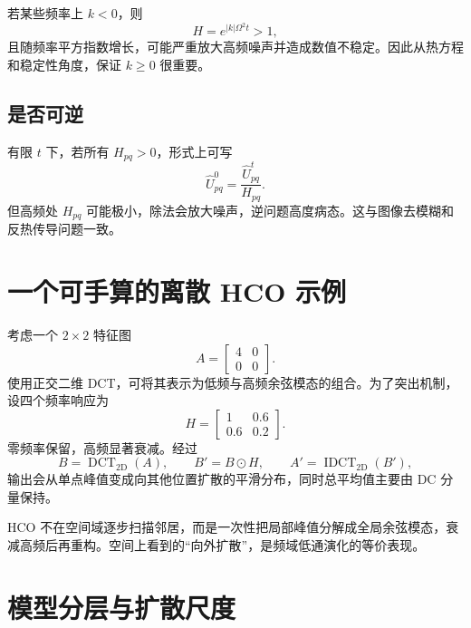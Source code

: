 \documentclass[UTF8,12pt,a4paper,fontset=none]{ctexart}
\numberwithin{equation}{section}
\newcommand{\DCT}{\operatorname{DCT}_{2\mathrm{D}}}
\newcommand{\IDCT}{\operatorname{IDCT}_{2\mathrm{D}}}
\begin{document}
若某些频率上 $k<0$，则
\begin{equation}
  H=e^{|k|\Omega^2t}>1,
\end{equation}
且随频率平方指数增长，可能严重放大高频噪声并造成数值不稳定。因此从热方程和稳定性角度，保证 $k\ge0$ 很重要。

\subsection{是否可逆}

有限 $t$ 下，若所有 $H_{pq}>0$，形式上可写
\begin{equation}
  \widehat U^0_{pq}
  =\frac{\widehat U^t_{pq}}{H_{pq}}.
\end{equation}
但高频处 $H_{pq}$ 可能极小，除法会放大噪声，逆问题高度病态。这与图像去模糊和反热传导问题一致。

\section{一个可手算的离散 HCO 示例}

考虑一个 $2\times2$ 特征图
\begin{equation}
  A=
  \begin{bmatrix}
    4&0\\
    0&0
  \end{bmatrix}.
\end{equation}
使用正交二维 DCT，可将其表示为低频与高频余弦模态的组合。为了突出机制，设四个频率响应为
\begin{equation}
  H=
  \begin{bmatrix}
    1&0.6\\
    0.6&0.2
  \end{bmatrix}.
\end{equation}
零频率保留，高频显著衰减。经过
\begin{equation}
  B=\DCT(A),
  \qquad B'=B\odot H,
  \qquad A'=\IDCT(B'),
\end{equation}
输出会从单点峰值变成向其他位置扩散的平滑分布，同时总平均值主要由 DC 分量保持。

\begin{keybox}[这个例子要表达的不是具体数值]
HCO 不在空间域逐步扫描邻居，而是一次性把局部峰值分解成全局余弦模态，衰减高频后再重构。空间上看到的“向外扩散”，是频域低通演化的等价表现。
\end{keybox}

\section{模型分层与扩散尺度}
\end{document}
